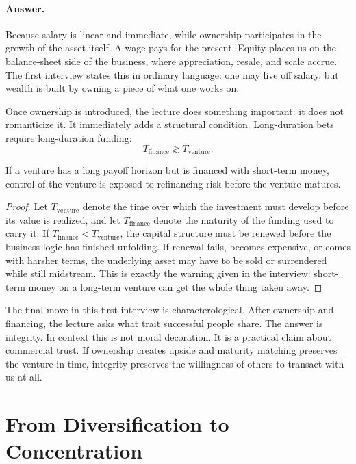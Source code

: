 \paragraph{Answer.} Because salary is linear and immediate, while ownership participates in the growth of the asset itself. A wage pays for the present. Equity places us on the balance-sheet side of the business, where appreciation, resale, and scale accrue. The first interview states this in ordinary language: one may live off salary, but wealth is built by owning a piece of what one works on.

Once ownership is introduced, the lecture does something important: it does not romanticize it. It immediately adds a structural condition. Long-duration bets require long-duration funding:
\begin{equation}
T_{\mathrm{finance}} \gtrsim T_{\mathrm{venture}}.
\end{equation}

\begin{proposition}
If a venture has a long payoff horizon but is financed with short-term money, control of the venture is exposed to refinancing risk before the venture matures.
\end{proposition}

\begin{proof}
Let $T_{\mathrm{venture}}$ denote the time over which the investment must develop before its value is realized, and let $T_{\mathrm{finance}}$ denote the maturity of the funding used to carry it. If $T_{\mathrm{finance}} < T_{\mathrm{venture}}$, the capital structure must be renewed before the business logic has finished unfolding. If renewal fails, becomes expensive, or comes with harsher terms, the underlying asset may have to be sold or surrendered while still midstream. This is exactly the warning given in the interview: short-term money on a long-term venture can get the whole thing taken away.
\end{proof}

The final move in this first interview is characterological. After ownership and financing, the lecture asks what trait successful people share. The answer is integrity. In context this is not moral decoration. It is a practical claim about commercial trust. If ownership creates upside and maturity matching preserves the venture in time, integrity preserves the willingness of others to transact with us at all.

\section{From Diversification to Concentration}

